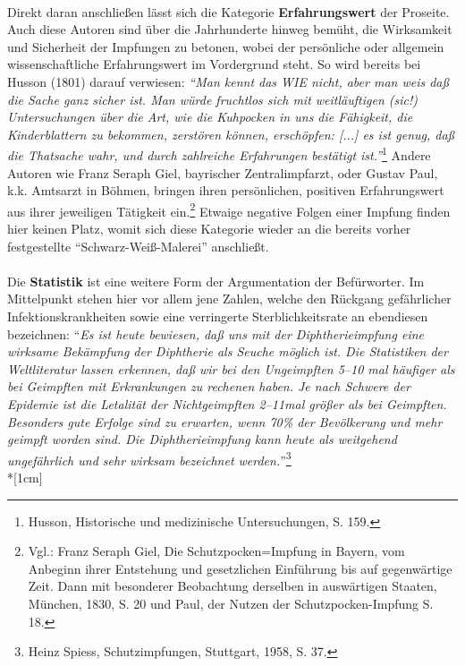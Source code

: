 \documentclass[
    a4paper,
    12pt,
    hyphens,
    chapterprefix=true,
    headheight=33pt,
    footheight=29pt,
    headings=optiontohead, %
]{scrartcl}
\begin{document}
{\\
Direkt daran anschließen lässt sich die Kategorie \textbf{Erfahrungswert} der Proseite. Auch diese Autoren sind über die Jahrhunderte hinweg bemüht, die Wirksamkeit und Sicherheit der Impfungen zu betonen, wobei der persönliche oder allgemein wissenschaftliche Erfahrungswert im Vordergrund steht.
So wird bereits bei Husson (1801) darauf verwiesen: \textit{"`Man kennt das WIE nicht, aber man weis daß die Sache ganz sicher ist. Man würde fruchtlos sich mit weitläuftigen (sic!) Untersuchungen über die Art, wie die Kuhpocken in uns die Fähigkeit, die Kinderblattern zu bekommen, zerstören können, erschöpfen: [...] es ist genug, daß die Thatsache wahr, und durch zahlreiche Erfahrungen bestätigt ist."'}\footnote{Husson, Historische und medizinische Untersuchungen,  S. 159.} Andere Autoren wie Franz Seraph Giel, bayrischer Zentralimpfarzt, oder Gustav Paul, k.k. Amtsarzt in Böhmen, bringen ihren persönlichen, positiven Erfahrungswert aus ihrer jeweiligen Tätigkeit ein.\footnote{Vgl.: Franz Seraph Giel, Die Schutzpocken=Impfung in Bayern, vom Anbeginn ihrer Entstehung und gesetzlichen Einführung  bis auf gegenwärtige Zeit. Dann mit besonderer Beobachtung derselben in auswärtigen Staaten, München, 1830, S. 20 und Paul, der Nutzen der Schutzpocken-Impfung S. 18.} Etwaige negative Folgen einer Impfung finden hier keinen Platz, womit sich diese Kategorie wieder an die bereits vorher festgestellte "`Schwarz-Weiß-Malerei"' anschließt.\\
\\
Die \textbf{Statistik} ist eine weitere Form der Argumentation der Befürworter. Im Mittelpunkt stehen hier vor allem jene Zahlen, welche den Rückgang gefährlicher Infektionskrankheiten sowie eine verringerte Sterblichkeitsrate an ebendiesen bezeichnen: "`\textit{Es ist heute bewiesen, daß uns mit der Diphtherieimpfung eine wirksame Bekämpfung der Diphtherie als Seuche möglich ist. Die Statistiken der Weltliteratur lassen erkennen, daß wir bei den Ungeimpften 5--10 mal häufiger als bei Geimpften mit Erkrankungen zu rechenen haben. Je nach Schwere der Epidemie ist die Letalität der Nichtgeimpften 2--11mal größer als bei Geimpften. Besonders gute Erfolge sind zu erwarten, wenn 70\% der Bevölkerung und mehr geimpft worden sind. Die Diphtherieimpfung kann heute als weitgehend ungefährlich und sehr wirksam bezeichnet werden.}"'\footnote{Heinz Spiess, Schutzimpfungen, Stuttgart, 1958, S. 37.}
\\*[1cm]
}
\end{document}
